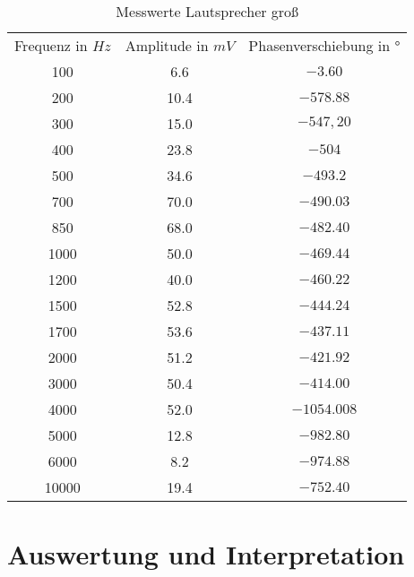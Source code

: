 \begin{table}[H]
\centering
\begin{tabular}{ccc}
  Frequenz in $Hz$ & Amplitude in $mV$ &  Phasenverschiebung in $°$ \\
  100 &  6.6& $-3.60$ \\
  200 & 10.4 & $-578.88$ \\
  300 & 15.0 & $-547,20$ \\
  400 & 23.8 & $-504$ \\
  500 & 34.6 & $-493.2$ \\
  700 & 70.0 & $-490.03$ \\
  850 & 68.0 & $-482.40$ \\
  1000 & 50.0 & $-469.44$ \\
  1200 & 40.0 & $-460.22$ \\
  1500 & 52.8 & $-444.24$ \\
  1700 & 53.6 & $-437.11$ \\
  2000 & 51.2 & $-421.92$ \\
  3000 & 50.4 & $-414.00$ \\
  4000 & 52.0 & $-1054.008$ \\
  5000 & 12.8 & $-982.80$ \\
  6000 & 8.2 & $-974.88$ \\
  10000 & 19.4 & $-752.40$ \\
 \end{tabular}
\label{tab:MLg}
\caption{Messwerte Lautsprecher groß}
\end{table}
\label{chap:VERSUCH_2_MESSWERTE}

\section{Auswertung und Interpretation}
